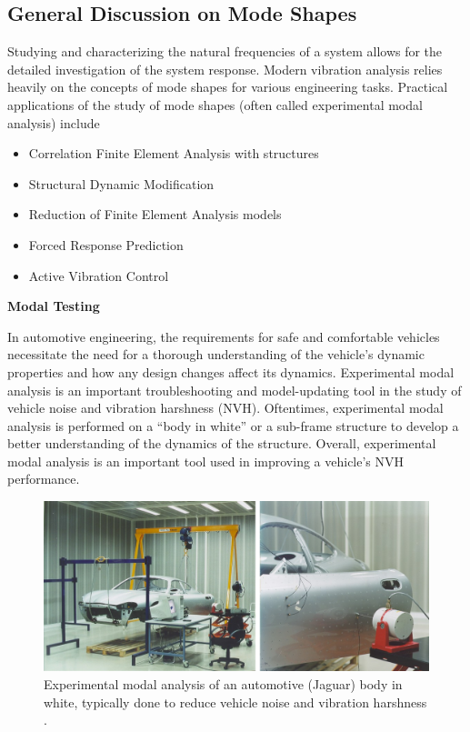 \documentclass[12pt,letter]{article}
\begin{document}
	\subsection{General Discussion on Mode Shapes}
	
	Studying and characterizing the natural frequencies of a system allows for the detailed investigation of the system response. Modern vibration analysis relies heavily on the concepts of mode shapes for various engineering tasks. Practical applications of the study of mode shapes (often called experimental modal analysis) include
	\begin{itemize}
		\item Correlation Finite Element Analysis with structures
		\item Structural Dynamic Modification
		\item Reduction of Finite Element Analysis models
		\item Forced Response Prediction			
		\item Active Vibration Control	
	\end{itemize}
	
	\begin{vibration_case_study}
		\textbf{Modal Testing}
		
		\noindent In automotive engineering, the requirements for safe and comfortable vehicles necessitate the need for a thorough understanding of the vehicle's dynamic properties and how any design changes affect its dynamics. Experimental modal analysis is an important troubleshooting and model-updating tool in the study of vehicle noise and vibration harshness (NVH). Oftentimes, experimental modal analysis is performed on a ``body in white'' or a sub-frame structure to develop a better understanding of the dynamics of the structure. Overall, experimental modal analysis is an important tool used in improving a vehicle's NVH performance.
		\begin{figure}[H]
			\centering
			\includegraphics[width=6in]{../figures/modal_testing}
			\caption{Experimental modal analysis of an automotive (Jaguar) body in white, typically done to reduce vehicle noise and vibration harshness \protect\footnotemark[1].}
		\end{figure}
	\end{vibration_case_study}
	
\end{document}
